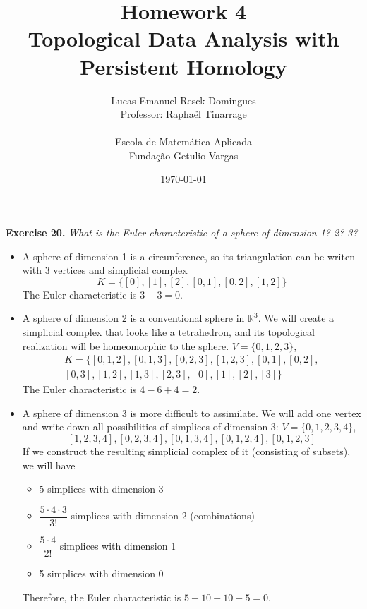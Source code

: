 \documentclass{article}
\title{Homework 4\\
    \large{Topological Data Analysis with Persistent Homology}}
\author{Lucas Emanuel Resck Domingues\\    
    Professor: Raphaël Tinarrage\\\\
    {Escola de Matemática Aplicada}\\
    {Fundação Getulio Vargas}}
\date{\today}
\begin{document}
    \maketitle

    \noindent \textbf{Exercise 20.} \textit{What is the Euler characteristic of a sphere of dimension 1? 2? 3?}

    \begin{itemize}
        \item A sphere of dimension 1 is a circunference, so its triangulation can be writen with 3 vertices and simplicial complex $$K = \{[0], [1], [2], [0, 1], [0, 2], [1, 2]\}$$
            The Euler characteristic is $3 - 3 = 0$.

        \item A sphere of dimension 2 is a conventional sphere in $\mathbb{R}^3$. We will create a simplicial complex that looks like a tetrahedron, and its topological realization will be homeomorphic to the sphere. $V = \{0, 1, 2, 3\}$,
            \begin{gather*}
                K = \{[0, 1, 2], [0, 1, 3], [0, 2, 3], [1, 2, 3], [0, 1], [0, 2], \\ [0, 3], [1, 2], [1, 3], [2, 3], [0], [1], [2], [3]\}
            \end{gather*}
            The Euler characteristic is $4 - 6 + 4 = 2$.

        \item A sphere of dimension 3 is more difficult to assimilate.
            We will add one vertex and write down all possibilities of simplices of dimension 3:
            $V = \{0, 1, 2, 3, 4\}$, $$[1, 2, 3, 4], [0, 2, 3, 4], [0, 1, 3, 4], [0, 1, 2, 4], [0, 1, 2, 3]$$
            If we construct the resulting simplicial complex of it (consisting of subsets), we will have
            \begin{itemize}
                \item 5 simplices with dimension 3
                \item $\dfrac{5 \cdot 4 \cdot 3}{3!}$ simplices with dimension 2 (combinations)
                \item $\dfrac{5 \cdot 4}{2!}$ simplices with dimension 1
                \item 5 simplices with dimension 0
            \end{itemize}
            Therefore, the Euler characteristic is $5 - 10 + 10 - 5 = 0$.\\

    \end{itemize}
\end{document}
